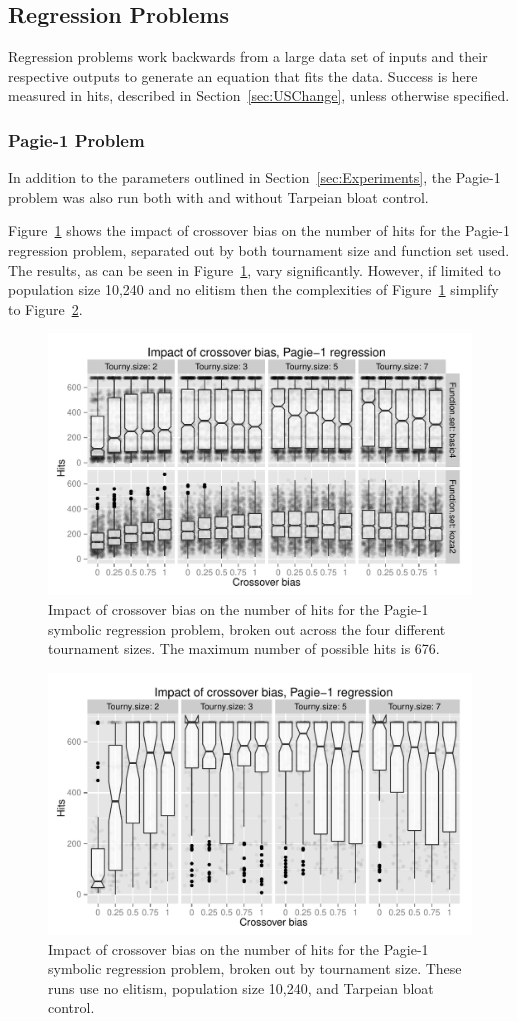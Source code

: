 \documentclass{sig-alternate}
\begin{document}
\subsection{Regression Problems}

Regression problems work backwards from a large data set of inputs and their respective outputs to generate an equation
that fits the data. Success is here measured in hits, described in Section~\ref{sec:USChange}, unless otherwise
specified.

\subsubsection{Pagie-1 Problem}

In addition to the parameters outlined in Section~\ref{sec:Experiments}, the Pagie-1 problem was also run both with and
without Tarpeian bloat control.

Figure~\ref{fig:Pagie1Hits_Bias_Tournys_FunctionSet} shows the impact of crossover bias on the number of hits for the
Pagie-1 regression problem, separated out by both tournament size and function set used. The results, as can be seen in
Figure~\ref{fig:Pagie1Hits_Bias_Tournys_FunctionSet}, vary significantly. However, if limited to population size 10,240
and no elitism then the complexities of Figure~\ref{fig:Pagie1Hits_Bias_Tournys_FunctionSet} simplify to
Figure~\ref{fig:Pagie1StrongHits_Bias_Tournys_FunctionSet}.

\begin{figure}
\centering
\includegraphics[width=0.45 \textwidth]{Plots/Pagie_1_Hits_vs_Bias_Tournys_FunctionSet.pdf}
\caption{Impact of crossover bias on the number of hits for the Pagie-1 symbolic regression problem, 
	broken out across the four different tournament sizes. The maximum number of possible hits is 676.}
\label{fig:Pagie1Hits_Bias_Tournys_FunctionSet}
\end{figure}

\begin{figure}
\centering
\includegraphics[width=0.45 \textwidth]{Plots/Pagie_1_strong_Hits_vs_Bias_Tournys_FunctionSet.pdf}
\caption{Impact of crossover bias on the number of hits for the Pagie-1 symbolic regression problem, 
	broken out by tournament size. These runs use no elitism, 
	population size 10,240, and Tarpeian bloat control.}
\label{fig:Pagie1StrongHits_Bias_Tournys_FunctionSet}
\end{figure}
\end{document}
